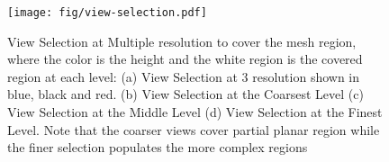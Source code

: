  \begin{figure}
\centering
	\texttt{[image: fig/view-selection.pdf]}
	\caption{View Selection at Multiple resolution to cover the mesh region, where the color is the height and the white region is the covered region at each level: (a) View Selection at 3 resolution shown in blue, black and red. (b) View Selection at the Coarsest Level (c) View Selection at the Middle Level (d) View Selection at the Finest Level. Note that the coarser views cover partial planar region while the finer selection populates the more complex regions }
\label{fig:viewselection}
\end{figure} 

